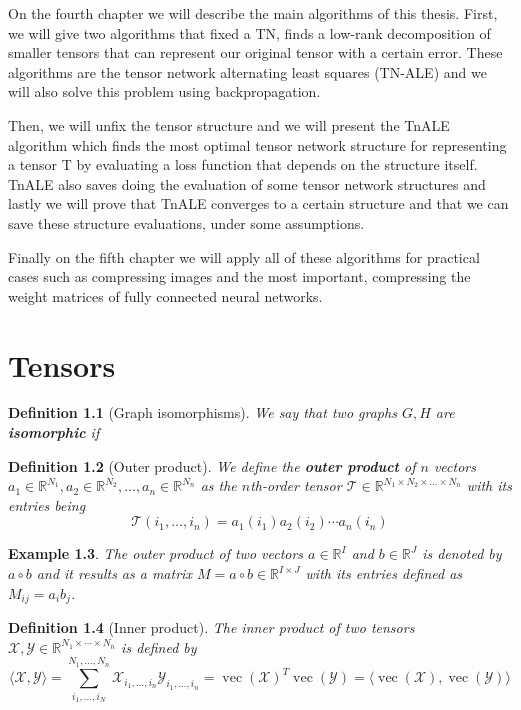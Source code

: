 \documentclass[11pt,a4paper,openright,oneside]{book}
\numberwithin{equation}{section}
\newtheorem{defn0}{Definition}[chapter]
\newtheorem{example0}[defn0]{Example}
\newenvironment{definition}{ \begin{defn0}}{\end{defn0}}
\newenvironment{example}{ \begin{example0}\rm}{\end{example0}}
\DeclareMathOperator{\vectorize}{vec}
\begin{document}
On the fourth chapter we will describe the main algorithms of this thesis. First, we will give two algorithms
that fixed a TN, finds a low-rank decomposition of smaller tensors that can represent our original tensor
with a certain error. These algorithms are the tensor network alternating least squares (TN-ALE) and
we will also solve this problem using backpropagation.

Then, we will unfix the tensor structure and we will present the TnALE algorithm which finds the most optimal
tensor network structure for representing a tensor T by evaluating a loss function that depends on the
structure itself. TnALE also saves doing the evaluation of some tensor network structures and lastly we will prove
that TnALE converges to a certain structure and that we can save these structure evaluations, under some assumptions.

Finally on the fifth chapter we will apply all of these algorithms for practical cases such as compressing images and
the most important, compressing the weight matrices of fully connected neural networks.


\chapter{Tensors}


\iffalse
\begin{definition}[Graph isomorphisms]
    We say that two graphs $G, H$ are \textbf{isomorphic} if 
\end{definition}


\begin{definition}[Outer product]
    We define the \textbf{outer product} of $n$ vectors 
    $a_1 \in \mathbb{R}^{N_1}, a_2 \in \mathbb{R}^{N_2}, \dots, a_n \in \mathbb{R}^{N_n}$
    as the $n$th-order tensor $\mathcal{T} \in \mathbb{R}^{N_1 \times N_2 \times \dots \times N_n}$ with its entries being
    $$\mathcal{T}(i_1, \dots, i_n) = a_1(i_1) a_2(i_2) \cdots a_n(i_n)$$
\end{definition}

\begin{example}
The outer product of two vectors $a \in \mathbb{R}^I$ and $b \in \mathbb{R}^J$ is denoted by $a \circ b$ and it results
as a matrix $M = a \circ b \in \mathbb{R}^{I \times J}$ with its entries defined as $M_{ij} = a_i b_j$.
\end{example}


\begin{definition}[Inner product]
The inner product of two tensors $\mathcal{X}, \mathcal{Y} \in \mathbb{R}^{N_1 \times \cdots \times N_n}$ is defined by
$$\langle \mathcal{X},\mathcal{Y} \rangle = \sum_{i_1, \dots, i_N}^{N_1, \dots, N_n} \mathcal{X}_{i_1, \dots, i_n} \mathcal{Y}_{i_1, \dots, i_n} = 
\vectorize(\mathcal{X})^T \vectorize(\mathcal{Y}) = \langle \vectorize(\mathcal{X}), \vectorize(\mathcal{Y}) \rangle$$
\end{definition}
\end{document}
